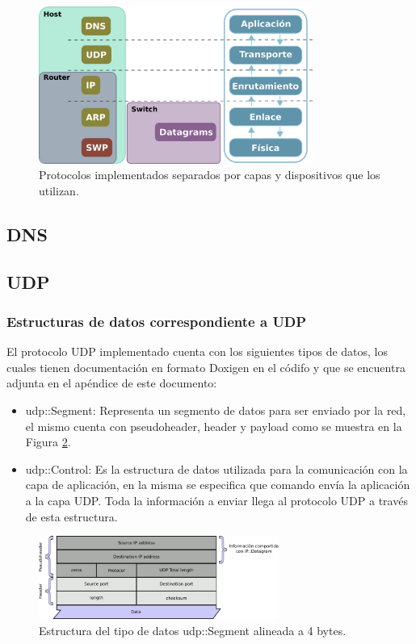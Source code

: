 \documentclass[10pt,a4paper]{article}
\begin{document}
\begin{figure}[!htb]
    \centering
    \includegraphics[width = 0.8\textwidth]{img/png/protocols.png}
    \caption{Protocolos implementados separados por capas y dispositivos que los utilizan.}
    \label{figure: protocolos}
\end{figure}
	
\subsection{DNS}
\subsection{UDP}

\subsubsection{Estructuras de datos correspondiente a UDP}

El protocolo UDP implementado cuenta con los siguientes tipos de datos, los cuales tienen documentación en formato Doxigen en el códifo y que se encuentra adjunta en el apéndice de este documento:
\begin{itemize}
\item udp::Segment: Representa un segmento de datos para ser enviado por la red, el mismo cuenta con pseudoheader, header y payload como se muestra en la Figura \ref{figure: udp segment}.
\item udp::Control: Es la estructura de datos utilizada para la comunicación con la capa de aplicación, en la misma se especifica que comando envía la aplicación a la capa UDP. Toda la información a enviar llega al protocolo UDP a través de esta estructura.
\end{itemize}

\begin{figure}[!htb]
    \centering
    \includegraphics[width = 0.7\textwidth]{img/png/UDP-Segment.png}
    \caption{Estructura del tipo de datos udp::Segment alineada a 4 bytes.}
    \label{figure: udp segment}
\end{figure}
\end{document}
